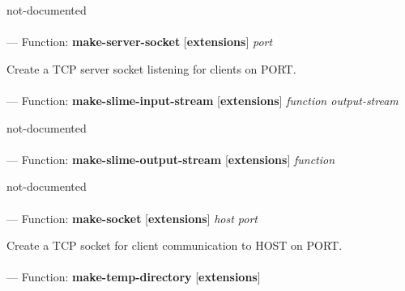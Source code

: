\begin{adjustwidth}{5em}{5em}
not-documented
\end{adjustwidth}

\paragraph{}
\label{EXTENSIONS:MAKE-SERVER-SOCKET}
--- Function: \textbf{make-server-socket} [\textbf{extensions}] \textit{port}

\begin{adjustwidth}{5em}{5em}
Create a TCP server socket listening for clients on PORT.
\end{adjustwidth}

\paragraph{}
\label{EXTENSIONS:MAKE-SLIME-INPUT-STREAM}
--- Function: \textbf{make-slime-input-stream} [\textbf{extensions}] \textit{function output-stream}

\begin{adjustwidth}{5em}{5em}
not-documented
\end{adjustwidth}

\paragraph{}
\label{EXTENSIONS:MAKE-SLIME-OUTPUT-STREAM}
--- Function: \textbf{make-slime-output-stream} [\textbf{extensions}] \textit{function}

\begin{adjustwidth}{5em}{5em}
not-documented
\end{adjustwidth}

\paragraph{}
\label{EXTENSIONS:MAKE-SOCKET}
--- Function: \textbf{make-socket} [\textbf{extensions}] \textit{host port}

\begin{adjustwidth}{5em}{5em}
Create a TCP socket for client communication to HOST on PORT.
\end{adjustwidth}

\paragraph{}
\label{EXTENSIONS:MAKE-TEMP-DIRECTORY}
--- Function: \textbf{make-temp-directory} [\textbf{extensions}] \textit{}

